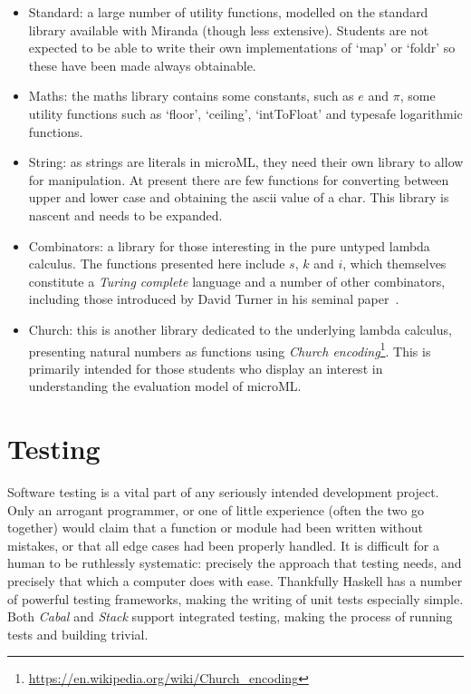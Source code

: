 \documentclass[12pt, a4paper]{report}
\begin{document}
\begin{itemize}
    \item Standard: a large number of utility functions, modelled on the standard library available
        with Miranda (though less extensive). Students are not expected to be able to write their
        own implementations of `map' or `foldr' so these have been made always obtainable.
    \item Maths: the maths library contains some constants, such as $e$ and $\pi$, some utility
        functions such as `floor', `ceiling', `intToFloat' and typesafe logarithmic functions.
    \item String: as strings are literals in microML, they need their own library to allow for
        manipulation. At present there are few functions for converting between upper and lower
        case and obtaining the ascii value of a char. This library is nascent and needs to be
        expanded.
    \item Combinators: a library for those interesting in the pure untyped lambda calculus. The
        functions presented here include $s$, $k$ and $i$, which themselves constitute a
        \textit{Turing complete} language and a number of other combinators, including those
        introduced by David Turner in his seminal paper~\cite{TUR79a}.
    \item Church: this is another library dedicated to the underlying lambda calculus, presenting
        natural numbers as functions using \textit{Church encoding}\footnote{\url{https://en.wikipedia.org/wiki/Church_encoding}}.
        This is primarily intended for those students who display an interest in understanding the
        evaluation model of microML\@.
\end{itemize}

\chapter{Testing}

Software testing is a vital part of any seriously intended development project. Only an arrogant
programmer, or one of little experience (often the two go together) would claim that a function or
module had been written without mistakes, or that all edge cases had been properly handled. It is
difficult for a human to be ruthlessly systematic: precisely the approach that testing needs, and
precisely that which a computer does with ease. Thankfully Haskell has a number of powerful testing
frameworks, making the writing of unit tests especially simple. Both \textit{Cabal} and
\textit{Stack} support integrated testing, making the process of running tests and building trivial.
\end{document}
